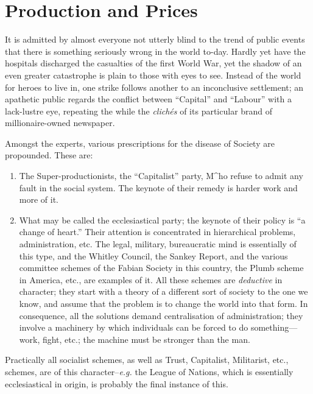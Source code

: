 \documentclass{book}
\begin{document}
\chapter{Production and Prices}
\label{chapter-5}
It is admitted by almost everyone not utterly blind to the trend of public events that there is something seriously wrong in the world to-day. Hardly yet have the hospitals discharged the casualties of the first World War, yet the shadow of an even greater catastrophe is plain to those with eyes to see. Instead of the world for heroes to live in, one strike follows another to an inconclusive settlement; an apathetic public regards the conflict between “Capital” and “Labour” with a lack-lustre eye, repeating the while the \emph{clichés} of its particular brand of millionaire-owned newspaper.

Amongst the experts, various prescriptions for the disease of Society are propounded. These are:

\begin{enumerate}
	\item The Super-productionists, the “Capitalist” party, M\textasciicircum{}ho refuse to admit any fault in the social system. The keynote of their remedy is harder work and more of it.


	\item What may be called the ecclesiastical party; the keynote of their policy is “a change of heart.” Their attention is concentrated in hierarchical problems, administration, etc. The legal, military, bureaucratic mind is essentially of this type, and the Whitley Council, the Sankey Report, and the various committee schemes of the Fabian Society in this country, the Plumb scheme in America, etc., are examples of it. All these schemes are \emph{deductive} in character; they start with a theory of a different sort of society to the one we know, and assume that the problem is to change the world into that form. In consequence, all the solutions demand centralisation of administration; they involve a machinery by which individuals can be forced to do something—work, fight, etc.; the machine must be stronger than the man.



\end{enumerate}
Practically all socialist schemes, as well as Trust, Capitalist, Militarist, etc., schemes, are of this character–\emph{e.g.} the League of Nations, which is essentially ecclesiastical in origin, is probably the final instance of this.
\end{document}
